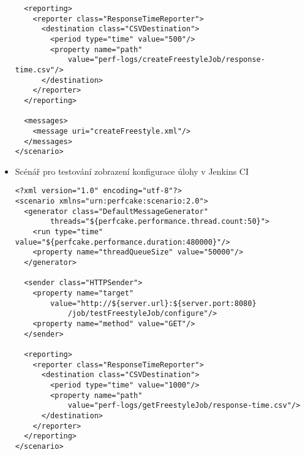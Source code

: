 \begin{itemize}
\begin{verbatim}
  <reporting>
    <reporter class="ResponseTimeReporter">
      <destination class="CSVDestination">
        <period type="time" value="500"/>
        <property name="path" 
            value="perf-logs/createFreestyleJob/response-time.csv"/>
      </destination>
    </reporter>
  </reporting>
    
  <messages>
    <message uri="createFreestyle.xml"/>
  </messages>
</scenario>
\end{verbatim}

\newpage
        \item Scénář pro testování zobrazení konfigurace úlohy v Jenkins CI
\begin{verbatim}
<?xml version="1.0" encoding="utf-8"?>
<scenario xmlns="urn:perfcake:scenario:2.0">
  <generator class="DefaultMessageGenerator" 
        threads="${perfcake.performance.thread.count:50}">
    <run type="time" value="${perfcake.performance.duration:480000}"/>
    <property name="threadQueueSize" value="50000"/>
  </generator>
  
  <sender class="HTTPSender">
    <property name="target" 
        value="http://${server.url}:${server.port:8080}
            /job/testFreestyleJob/configure"/>
    <property name="method" value="GET"/>                                                                                               
  </sender>
  
  <reporting>
    <reporter class="ResponseTimeReporter">
      <destination class="CSVDestination">
        <period type="time" value="1000"/>
        <property name="path" 
            value="perf-logs/getFreestyleJob/response-time.csv"/>
      </destination>
    </reporter>
  </reporting>
</scenario>

\end{verbatim}
    \end{itemize}




